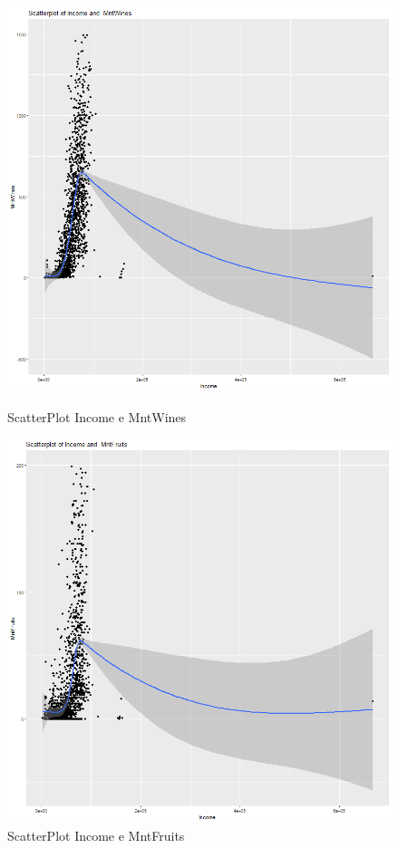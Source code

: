 \documentclass[letterpaper,11pt]{article}
\begin{document}
\newpage

\begin{figure}[h]
  \centering
  \begin{minipage}[b]{0.4\textwidth}
    \includegraphics[width=\textwidth]{Img/EDA/EDA009.png}
    \caption{ScatterPlot Income e MntWines}
     \label{fig:ScatterPlotIncomeMntWines}
  \end{minipage}
  \hfill
  \begin{minipage}[b]{0.4\textwidth}
    \includegraphics[width=\textwidth]{Img/EDA/EDA010.png}
    \caption{ScatterPlot Income e MntFruits}
     \label{fig:ScatterPlotIncomeMntFruits}
  \end{minipage}
\end{figure}
\end{document}
